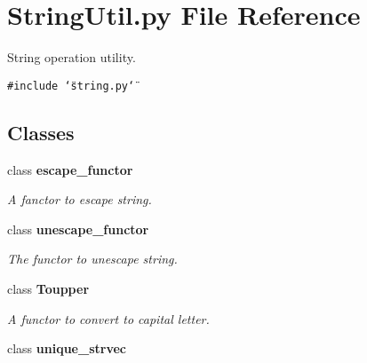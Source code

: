 \section{String\-Util.py File Reference}
\label{StringUtil_8py}
String operation utility. 

{\tt \#include \char`\"{}string.py\char`\"{}}\par
\subsection*{Classes}
\begin{CompactItemize}
\item 
class {\bf escape\_\-functor}
\begin{CompactList}\small\item\em A fanctor to escape string. \item\end{CompactList}\item 
class {\bf unescape\_\-functor}
\begin{CompactList}\small\item\em The functor to unescape string. \item\end{CompactList}\item 
class {\bf Toupper}
\begin{CompactList}\small\item\em A functor to convert to capital letter. \item\end{CompactList}\item 
class {\bf unique\_\-strvec}
\end{CompactItemize}
